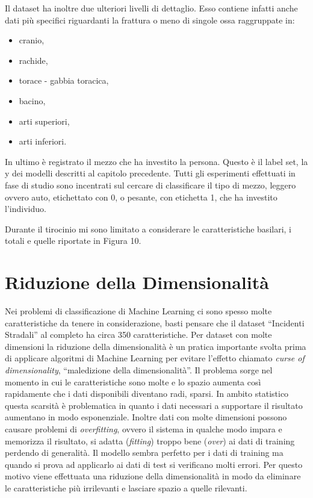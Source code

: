 \documentclass[12pt,italian]{report}
\begin{document}
Il dataset ha inoltre due ulteriori livelli di dettaglio. Esso contiene infatti anche dati più specifici riguardanti la frattura o meno di singole ossa raggruppate in:
\begin{itemize}
	\item cranio,
	\item rachide,
	\item torace - gabbia toracica,
	\item bacino,
	\item arti superiori,
	\item arti inferiori.
\end{itemize}
In ultimo è registrato il mezzo che ha investito la persona. Questo è il label set, la y dei modelli descritti al capitolo precedente. Tutti gli esperimenti effettuati in fase di studio sono incentrati sul cercare di classificare il tipo di mezzo, leggero ovvero auto, etichettato con 0, o pesante, con etichetta 1, che ha investito l'individuo.

Durante il tirocinio mi sono limitato a considerare le caratteristiche basilari, i totali e quelle riportate in Figura 10.
\section{Riduzione della Dimensionalità}
\label{sec:riduzione}
Nei problemi di classificazione di Machine Learning ci sono spesso molte caratteristiche da tenere in considerazione, basti pensare che il dataset ``Incidenti Stradali'' al completo ha circa 350 caratteristiche. Per dataset con molte dimensioni la riduzione della dimensionalità è un pratica importante svolta prima di applicare algoritmi di Machine Learning per evitare l'effetto chiamato \textit{curse of dimensionality}, ``maledizione della dimensionalità''\cite{shalevshwartz2014understanding}. Il problema sorge nel momento in cui le caratteristiche sono molte e lo spazio aumenta così rapidamente che i dati disponibili diventano radi, sparsi. In ambito statistico questa scarsità è problematica in quanto i dati necessari a supportare il risultato aumentano in modo esponenziale.
Inoltre dati con molte dimensioni possono causare problemi di \textit{overfitting}, ovvero il sistema in qualche modo impara e memorizza il risultato, si adatta (\textit{fitting}) troppo bene (\textit{over}) ai dati di training perdendo di generalità. Il modello sembra perfetto per i dati di training ma quando si prova ad applicarlo ai dati di test si verificano molti errori.
Per questo motivo viene effettuata una riduzione della dimensionalità in modo da eliminare le caratteristiche più irrilevanti e lasciare spazio a quelle rilevanti. 
\end{document}
